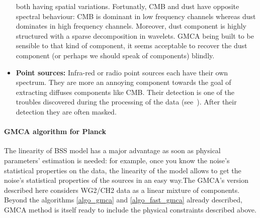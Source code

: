 \begin{itemize}
both having spatial variations. Fortunatly, CMB and dust have opposite spectral behaviour: CMB is dominant in low frequency channels whereas dust dominates in high frequency channels. Moreover, 
dust component is highly structured with a sparse decomposition in wavelets. GMCA being built to be sensible to that kind of component, it seems acceptable to recover the dust component 
(or perhaps we should speak of components) blindly.
\item {\bf Point sources:} Infra-red or radio point sources each have their own spectrum. They are more an annoying component towards the goal of extracting diffuses components like CMB. 
Their detection is one of the troubles discovered during the processing of the data (see~\citep{leach08}). After their detection they are often masked.
\end{itemize}

\paragraph*{GMCA algorithm for Planck}

The linearity of BSS model has a major advantage as soon as physical parameters' estimation is needed: for example, once you know the noise's statistical properties on the data, 
the linearity of the model allows to get the noise's statistical properties of the sources in an easy way.The GMCA's version described here considers WG2/CH2 data as a linear 
mixture of components. Beyond the algorithms \ref{algo_gmca} and \ref{algo_fast_gmca} already described, GMCA method is itself ready to include the physical constraints described above.


